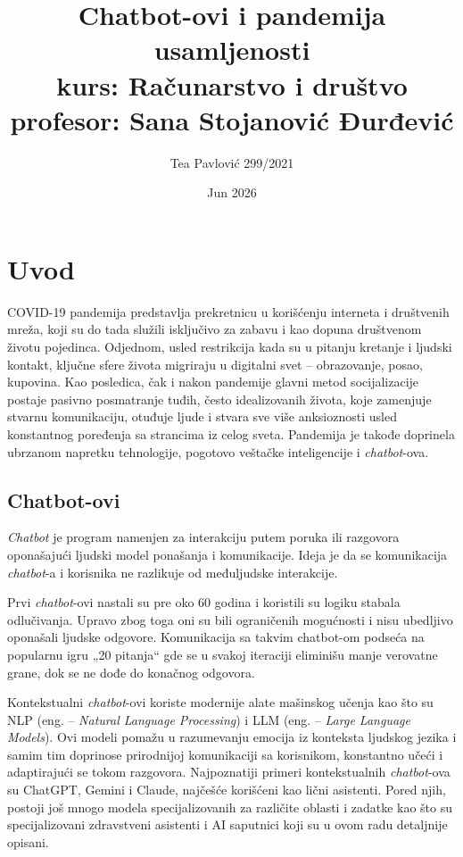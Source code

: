 \documentclass{article}
\title{Chatbot-ovi i pandemija usamljenosti \\[0.3cm] \large kurs: Računarstvo i društvo \\[0.3cm] \large profesor: Sana Stojanović Đurđević}
\author{Tea Pavlović 299/2021}
\date{Jun 2026}
\begin{document}
\maketitle

\newpage

\tableofcontents

\newpage

\section{Uvod}

COVID-19 pandemija predstavlja prekretnicu u korišćenju interneta i društvenih mreža, koji su do tada služili isključivo za zabavu i kao dopuna društvenom životu pojedinca. Odjednom, usled restrikcija kada su u pitanju kretanje i ljudski kontakt, ključne sfere života migriraju u digitalni svet – obrazovanje, posao, kupovina. Kao posledica, čak i nakon pandemije glavni metod socijalizacije postaje pasivno posmatranje tuđih, često idealizovanih života, koje zamenjuje stvarnu komunikaciju, otuđuje ljude i stvara sve više anksioznosti usled konstantnog poređenja sa strancima iz celog sveta.
Pandemija je takođe doprinela ubrzanom napretku tehnologije, pogotovo veštačke inteligencije i \textit{chatbot}-ova.

\subsection{Chatbot-ovi}

\textit{Chatbot} je program namenjen za interakciju putem poruka ili razgovora oponašajući ljudski model ponašanja i komunikacije. Ideja je da se komunikacija \textit{chatbot}-a i korisnika ne razlikuje od međuljudske interakcije. 

Prvi \textit{chatbot}-ovi nastali su pre oko 60 godina i koristili su logiku stabala odlučivanja. Upravo zbog toga oni su bili ograničenih mogućnosti i nisu ubedljivo oponašali ljudske odgovore. Komunikacija sa takvim chatbot-om podseća na popularnu igru „20 pitanja“ gde se u svakoj iteraciji eliminišu manje verovatne grane, dok se ne dođe do konačnog odgovora. 

Kontekstualni \textit{chatbot}-ovi koriste modernije alate mašinskog učenja kao što su NLP (eng. – \textit{Natural Language Processing}) i LLM (eng. – \textit{Large Language Models}). Ovi modeli pomažu u razumevanju emocija iz konteksta ljudskog jezika i samim tim doprinose prirodnijoj komunikaciji sa korisnikom, konstantno učeći i adaptirajući se tokom razgovora. Najpoznatiji primeri kontekstualnih \textit{chatbot}-ova su ChatGPT, Gemini i Claude, najčešće korišćeni kao lični asistenti. Pored njih, postoji još mnogo modela specijalizovanih za različite oblasti i zadatke kao što su specijalizovani zdravstveni asistenti i AI saputnici koji su u ovom radu detaljnije opisani.
\end{document}
